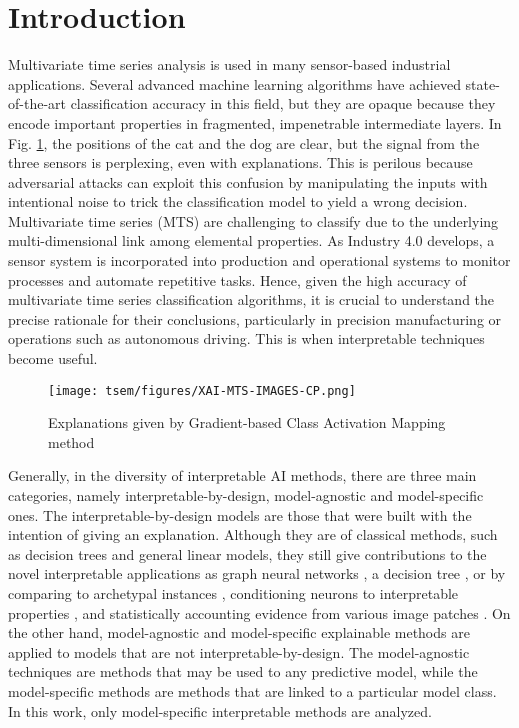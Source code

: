 \documentclass{svproc}
\begin{document}
\section{Introduction}
Multivariate time series analysis is used in many sensor-based industrial applications. Several advanced machine learning algorithms have achieved state-of-the-art classification accuracy in this field, but they are opaque because they encode important properties in fragmented, impenetrable intermediate layers. In Fig. \ref{fig:XAI_gen}, the positions of the cat and the dog are clear, but the signal from the three sensors is perplexing, even with explanations. This is perilous because adversarial attacks can exploit this confusion by manipulating the inputs with intentional noise to trick the classification model to yield a wrong decision. Multivariate time series (MTS) are challenging to classify due to the underlying multi-dimensional link among elemental properties. As Industry 4.0 develops, a sensor system is incorporated into production and operational systems to monitor processes and automate repetitive tasks. Hence, given the high accuracy of multivariate time series classification algorithms, it is crucial to understand the precise rationale for their conclusions, particularly in precision manufacturing or operations such as autonomous driving. This is when interpretable techniques become useful. 

\begin{figure}[h]
\centering
\texttt{[image: tsem/figures/XAI-MTS-IMAGES-CP.png]}
\caption{Explanations given by Gradient-based Class Activation Mapping method}
\label{fig:XAI_gen}
\end{figure}

Generally, in the diversity of interpretable AI methods, there are three main categories, namely interpretable-by-design, model-agnostic and model-specific ones. The interpretable-by-design models are those that were built with the intention of giving an explanation. Although they are of classical methods, such as decision trees and general linear models, they still give contributions to the novel interpretable applications as graph neural networks \cite{pfeifer2022gnn}, a decision tree \cite{nauta2021neural}, or by comparing to archetypal instances \cite{chen2019looks}, conditioning neurons to interpretable properties \cite{hu2019introductory,koh2020concept}, and statistically accounting evidence from various image patches \cite{brendel2019approximating}. On the other hand, model-agnostic and model-specific explainable methods are applied to models that are not interpretable-by-design. The model-agnostic techniques are methods that may be used to any predictive model, while the model-specific methods are methods that are linked to a particular model class. In this work, only model-specific interpretable methods are analyzed. 
\end{document}
